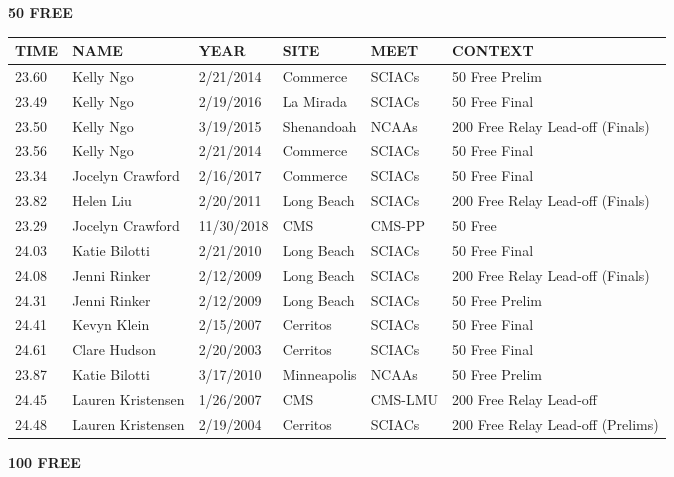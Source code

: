 \begin{table}[H]
\centering
\begin{minipage}[t]{0.48\textwidth}
\centering
\textbf{50 FREE}\\[0.1cm]
\begin{tabular}{@{}p{1.8cm}p{2.8cm}p{1.2cm}p{1.4cm}p{1.4cm}p{2.0cm}@{}}
\hline
    \textbf{TIME} & \textbf{NAME} & \textbf{YEAR} & \textbf{SITE} & \textbf{MEET} & \textbf{CONTEXT} \\
\hline
    23.60 & Kelly Ngo & 2/21/2014 & Commerce & SCIACs & 50 Free Prelim \\
    23.49 & Kelly Ngo & 2/19/2016 & La Mirada & SCIACs & 50 Free Final \\
    23.50 & Kelly Ngo & 3/19/2015 & Shenandoah & NCAAs & 200 Free Relay Lead-off (Finals) \\
    23.56 & Kelly Ngo & 2/21/2014 & Commerce & SCIACs & 50 Free Final \\
    23.34 & Jocelyn Crawford & 2/16/2017 & Commerce & SCIACs & 50 Free Final \\
    23.82 & Helen Liu & 2/20/2011 & Long Beach & SCIACs & 200 Free Relay Lead-off (Finals) \\
    23.29 & Jocelyn Crawford & 11/30/2018 & CMS & CMS-PP & 50 Free \\
    24.03 & Katie Bilotti & 2/21/2010 & Long Beach & SCIACs & 50 Free Final \\
    24.08 & Jenni Rinker & 2/12/2009 & Long Beach & SCIACs & 200 Free Relay Lead-off (Finals) \\
    24.31 & Jenni Rinker & 2/12/2009 & Long Beach & SCIACs & 50 Free Prelim \\
    24.41 & Kevyn Klein & 2/15/2007 & Cerritos & SCIACs & 50 Free Final \\
    24.61 & Clare Hudson & 2/20/2003 & Cerritos & SCIACs & 50 Free Final \\
    23.87 & Katie Bilotti & 3/17/2010 & Minneapolis & NCAAs & 50 Free Prelim \\
    24.45 & Lauren Kristensen & 1/26/2007 & CMS & CMS-LMU & 200 Free Relay Lead-off \\
    24.48 & Lauren Kristensen & 2/19/2004 & Cerritos & SCIACs & 200 Free Relay Lead-off (Prelims) \\
\hline
\end{tabular}
\end{minipage}\hfill
\begin{minipage}[t]{0.48\textwidth}
\centering
\textbf{100 FREE}\\[0.1cm]

\end{minipage}
\end{table}
